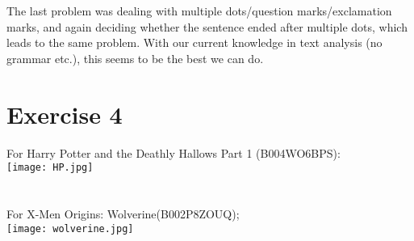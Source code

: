 \documentclass{article}
\begin{document}
The last problem was dealing with multiple dots/question marks/exclamation marks, and again deciding whether the sentence ended after multiple dots, which leads to the same problem. With our current knowledge in text analysis (no grammar etc.), this seems to be the best we can do.

\section*{Exercise 4}
For Harry Potter and the Deathly Hallows Part 1  (B004WO6BPS):\\
\texttt{[image: HP.jpg]}\\\\\\
For X-Men Origins: Wolverine(B002P8ZOUQ);\\
\texttt{[image: wolverine.jpg]}
\end{document}

